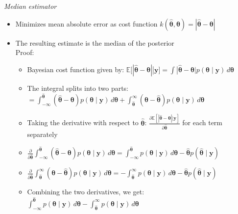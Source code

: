 \emph{Median estimator}
\begin{itemize}
    \item Minimizes mean absolute error as cost function $k(\hat{\boldsymbol{\theta}},\boldsymbol{\theta}) = | \hat{\boldsymbol{\theta}} - \boldsymbol{\theta} |$
    \item The resulting estimate is the median of the posterior\\
    Proof:
    \begin{itemize}
        \item Bayesian cost function given by:
        $
        \mathbb{E}[| \hat{\boldsymbol{\theta}} - \boldsymbol{\theta} | | \boldsymbol{y}] = \int |\hat{\boldsymbol{\theta}} - \boldsymbol{\theta}| p(\boldsymbol{\theta} \mid \boldsymbol{y}) \, d\boldsymbol{\theta}
        $
        \item The integral splits into two parts:
        $
        = \int_{-\infty}^{\hat{\boldsymbol{\theta}}} (\hat{\boldsymbol{\theta}} - \boldsymbol{\theta}) p(\boldsymbol{\theta} \mid \boldsymbol{y}) \, d\boldsymbol{\theta} + \int_{\hat{\boldsymbol{\theta}}}^{\infty} (\boldsymbol{\theta} - \hat{\boldsymbol{\theta}}) p(\boldsymbol{\theta} \mid \boldsymbol{y}) \, d\boldsymbol{\theta}
        $
        \item Taking the derivative with respect to $\hat{\boldsymbol{\theta}}$: $\frac{\partial \mathbb{E}[| \hat{\boldsymbol{\theta}} - \boldsymbol{\theta} | | \boldsymbol{y}]}{\partial \hat{\boldsymbol{\theta}}}$ for each term separately
        \item $\frac{\partial}{\partial\hat{\boldsymbol{\theta}}} \int_{-\infty}^{\hat{\boldsymbol{\theta}}} (\hat{\boldsymbol{\theta}} - \boldsymbol{\theta}) p(\boldsymbol{\theta} \mid \boldsymbol{y}) \, d\boldsymbol{\theta} = \int_{-\infty}^{\hat{\boldsymbol{\theta}}} p(\boldsymbol{\theta} \mid \boldsymbol{y}) \, d\boldsymbol{\theta} - \hat{\boldsymbol{\theta}} p(\hat{\boldsymbol{\theta}} \mid \boldsymbol{y})$
        \item $\frac{\partial}{\partial\hat{\boldsymbol{\theta}}} \int_{\hat{\boldsymbol{\theta}}}^{\infty} (\boldsymbol{\theta} - \hat{\boldsymbol{\theta}}) p(\boldsymbol{\theta} \mid \boldsymbol{y}) \, d\boldsymbol{\theta} = -\int_{\hat{\boldsymbol{\theta}}}^{\infty} p(\boldsymbol{\theta} \mid \boldsymbol{y}) \, d\boldsymbol{\theta} - \hat{\boldsymbol{\theta}} p(\hat{\boldsymbol{\theta}} \mid \boldsymbol{y})$
        \item Combining the two derivatives, we get:
        $ \int_{-\infty}^{\hat{\boldsymbol{\theta}}} p(\boldsymbol{\theta} \mid \boldsymbol{y}) \, d\boldsymbol{\theta} - \int_{\hat{\boldsymbol{\theta}}}^{\infty} p(\boldsymbol{\theta} \mid \boldsymbol{y}) \, d\boldsymbol{\theta}$

\end{itemize}
\end{itemize}

